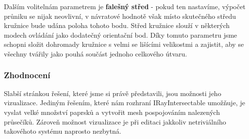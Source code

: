 Dalším volitelnám parametrem je \textbf{falešný střed} - pokud ten nastavíme, výpočet průniku se nijak neovlivní, v návratové hodnotě však místo skutečného středu kružnice bude udána poloha tohoto bodu. Střed kružnice slouží v některých modech ovládání jako dodatečný orientační bod. Díky tomuto parametru jsme schopni složit dohromady kružnice s velmi se lišícími velikostmi a zajistit, aby se všechny tvářily jako pouhá součást jednoho celkového útvaru. 

\subsubsection*{Zhodnocení}

Slabší stránkou řešení, které jsme si právě představili, jsou možnosti jeho vizualizace. Jediným řešením, které nám rozhraní IRayIntersectable umožňuje, je vyslat velké množství paprsků a vytvořit mesh pospojováním nalezených průsečíků. Zároveň možnost vizualizace je při editaci jakkoliv netriviálního takovéhoto systému naprosto nezbytná.

